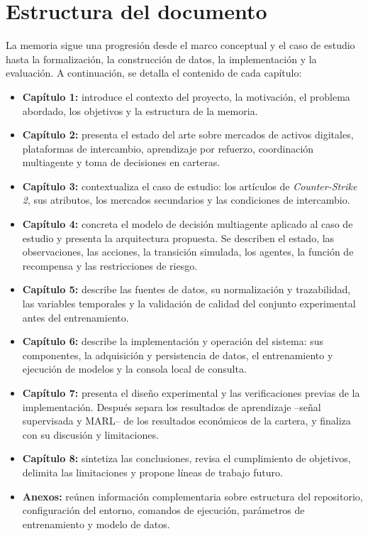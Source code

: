 \section{Estructura del documento}

La memoria sigue una progresión desde el marco conceptual y el caso de estudio hasta la formalización, la construcción de datos, la implementación y la evaluación. A continuación, se detalla el contenido de cada capítulo:

\begin{itemize}
  \item \textbf{Capítulo 1:} introduce el contexto del proyecto, la motivación, el problema abordado, los objetivos y la estructura de la memoria.
  \item \textbf{Capítulo 2:} presenta el estado del arte sobre mercados de activos digitales, plataformas de intercambio, aprendizaje por refuerzo, coordinación multiagente y toma de decisiones en carteras.
  \item \textbf{Capítulo 3:} contextualiza el caso de estudio: los artículos de \textit{Counter-Strike 2}, sus atributos, los mercados secundarios y las condiciones de intercambio.
  \item \textbf{Capítulo 4:} concreta el modelo de decisión multiagente aplicado al caso de estudio y presenta la arquitectura propuesta. Se describen el estado, las observaciones, las acciones, la transición simulada, los agentes, la función de recompensa y las restricciones de riesgo.
  \item \textbf{Capítulo 5:} describe las fuentes de datos, su normalización y trazabilidad, las variables temporales y la validación de calidad del conjunto experimental antes del entrenamiento.
  \item \textbf{Capítulo 6:} describe la implementación y operación del sistema: sus componentes, la adquisición y persistencia de datos, el entrenamiento y ejecución de modelos y la consola local de consulta.
  \item \textbf{Capítulo 7:} presenta el diseño experimental y las verificaciones previas de la implementación. Después separa los resultados de aprendizaje --señal supervisada y MARL-- de los resultados económicos de la cartera, y finaliza con su discusión y limitaciones.
  \item \textbf{Capítulo 8:} sintetiza las conclusiones, revisa el cumplimiento de objetivos, delimita las limitaciones y propone líneas de trabajo futuro.
  \item \textbf{Anexos:} reúnen información complementaria sobre estructura del repositorio, configuración del entorno, comandos de ejecución, parámetros de entrenamiento y modelo de datos.
\end{itemize}
